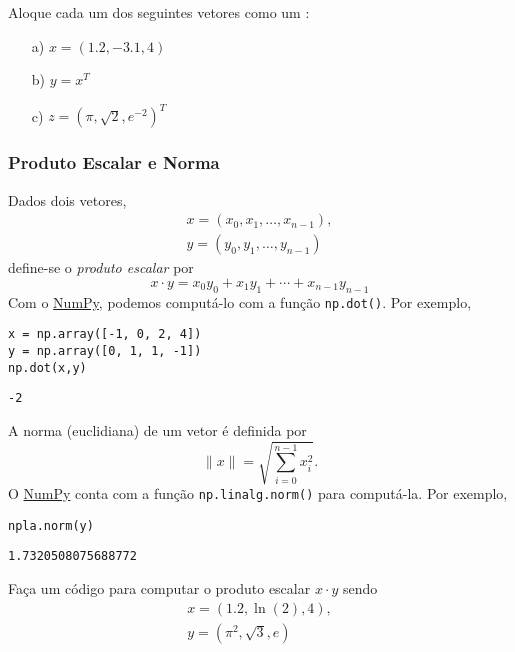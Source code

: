 \documentclass[12pt]{article}
\begin{document}
\begin{exr}
  Aloque cada um dos seguintes vetores como um {\PYTHONnumpyDOTarray}:
  \begin{enumerate}
  \item[a)] $x = (1.2, -3.1, 4)$
  \item[b)] $y = x^T$
  \item[c)] $z = (\pi, \sqrt{2}, e^{-2})^T$
  \end{enumerate}
\end{exr}

\subsubsection{Produto Escalar e Norma}

Dados dois vetores,
\begin{gather}
  x = (x_0, x_1, \dotsc, x_{n-1}),\\
  y = (y_0, y_1, \dotsc, y_{n-1})
\end{gather}
define-se o \emph{produto escalar} por
\begin{equation}
  x\cdot y = x_0y_0 + x_1y_1 + \cdots + x_{n-1}y_{n-1}
\end{equation}
Com o \href{https://numpy.org/}{NumPy}, podemos computá-lo com a função \lstinline+np.dot()+. Por exemplo,

\begin{lstlisting}
x = np.array([-1, 0, 2, 4])
y = np.array([0, 1, 1, -1])
np.dot(x,y)
\end{lstlisting}

\begin{verbatim}
-2
\end{verbatim}

A norma (euclidiana) de um vetor é definida por
\begin{equation}
  \|x\| = \sqrt{\sum_{i=0}^{n-1} x_i^2}.
\end{equation}
O \href{https://numpy.org/}{NumPy} conta com a função \lstinline+np.linalg.norm()+ para computá-la. Por exemplo,

\begin{lstlisting}
npla.norm(y)
\end{lstlisting}

\begin{verbatim}
1.7320508075688772
\end{verbatim}

\begin{exr}
  Faça um código para computar o produto escalar $x\cdot y$ sendo
  \begin{gather}
    x = (1.2, \ln(2), 4),\\
    y = (\pi^2, \sqrt{3}, e)
  \end{gather}
\end{exr}
\end{document}
